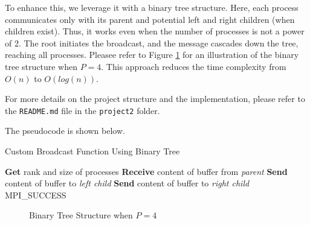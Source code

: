 \documentclass[12pt,a4paper]{article}
\begin{document}
To enhance this, 
we leverage it with a binary tree structure. 
Here, each process communicates only with its parent and potential left and right children (when children exist). 
Thus, it works even when the number of processes is not a power of 2.
The root initiates the broadcast, and the message cascades down the tree, reaching all processes.
Pleasee refer to Figure \ref{fig:binary_tree} for an illustration of the binary tree structure when $P = 4$.
This approach reduces the time complexity from $O(n)$ to $O(log(n))$.

For more details on the project structure and the implementation, 
please refer to the \texttt{README.md} file in the \texttt{project2} folder.

The pseudocode is shown below.
\begin{algorithm}
    \caption{Custom Broadcast Function Using Binary Tree}
    \begin{algorithmic}[1]
    \State \textbf{Get} rank and size of processes
            \State \textbf{Receive} content of buffer from \textit{parent} 
        \EndIf
            \State \textbf{Send} content of buffer to \textit{left child} 
        \EndIf
            \State \textbf{Send} content of buffer to \textit{right child} 
        \EndIf
        \State \Return MPI\_SUCCESS
    \EndProcedure
    \end{algorithmic}
\end{algorithm}
\begin{figure}
    \centering
    \caption{Binary Tree Structure when $P = 4$}
    \label{fig:binary_tree}
\end{figure}
\end{document}
